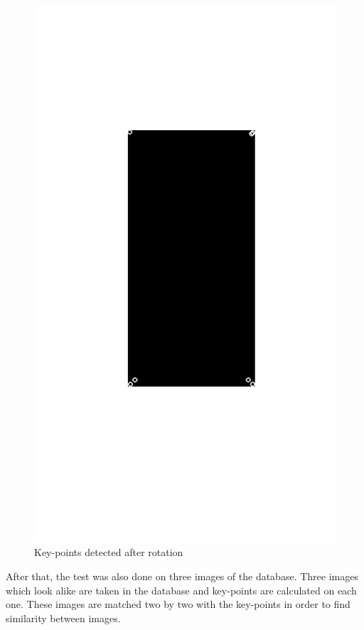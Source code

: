 \documentclass[12pt]{article}
\begin{document}
\begin{figure}[!h]
    \center
    \includegraphics[scale=0.3]{rot1.jpg}
    \caption{Key-points detected after rotation}
    \label{figure:Illustration }
\end{figure}
\clearpage

After that, the test was also done on three images of the database. Three  images which look alike are taken in the database and key-points are calculated on each one. 
These images are matched two by two with the key-points in order to find similarity between images.
\end{document}
